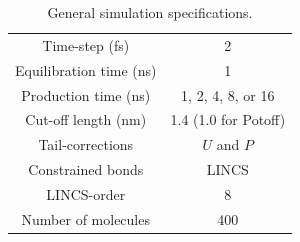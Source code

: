 \documentclass[preprint,review,12pt]{elsarticle}
\begin{document}
	 
	\begin{table}[htb!]
		\caption{General simulation specifications.} \label{tab:sim_specs}
		\begin{center}
			\begin{tabular}{|c|c|}
				\hline
				Time-step (fs) & 2 \\
				Equilibration time (ns) & 1 \\
				Production time (ns) & 1, 2, 4, 8, or 16 \\
				Cut-off length (nm) & 1.4 (1.0 for Potoff) \\
				Tail-corrections & $U$ and $P$ \\
				Constrained bonds & LINCS \cite{Hess1998,Hess2008} \\
				LINCS-order & 8 \\			     
				Number of molecules & 400 \\
				\hline        
			\end{tabular}
		\end{center}
	\end{table}
	
	
\end{document}
